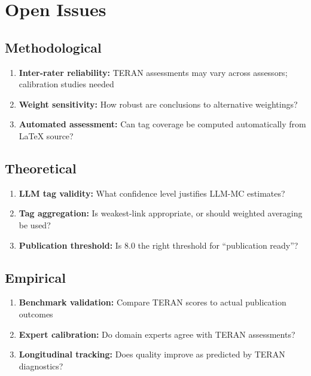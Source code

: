 \documentclass[11pt,a4paper]{article}
\begin{document}
\section{Open Issues}

\subsection{Methodological}

\begin{enumerate}
    \item \textbf{Inter-rater reliability:} TERAN assessments may vary across assessors; calibration studies needed
    \item \textbf{Weight sensitivity:} How robust are conclusions to alternative weightings?
    \item \textbf{Automated assessment:} Can tag coverage be computed automatically from LaTeX source?
\end{enumerate}

\subsection{Theoretical}

\begin{enumerate}
    \item \textbf{LLM tag validity:} What confidence level justifies LLM-MC estimates?
    \item \textbf{Tag aggregation:} Is weakest-link appropriate, or should weighted averaging be used?
    \item \textbf{Publication threshold:} Is 8.0 the right threshold for ``publication ready''?
\end{enumerate}

\subsection{Empirical}

\begin{enumerate}
    \item \textbf{Benchmark validation:} Compare TERAN scores to actual publication outcomes
    \item \textbf{Expert calibration:} Do domain experts agree with TERAN assessments?
    \item \textbf{Longitudinal tracking:} Does quality improve as predicted by TERAN diagnostics?
\end{enumerate}
\end{document}

